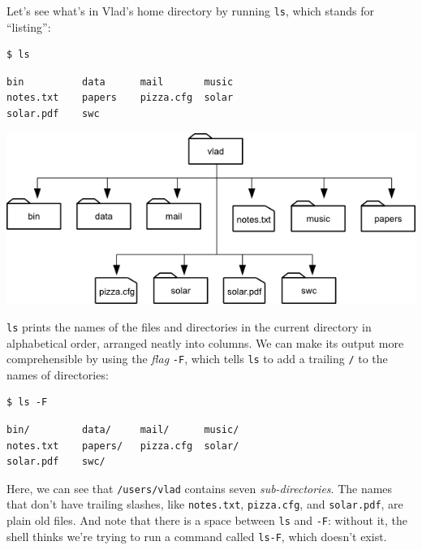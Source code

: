 \documentclass[]{book}
\newcommand{\gdef}[2]{\emph{#2}}
\begin{document}
Let's see what's in Vlad's home directory by running \texttt{ls}, which
stands for ``listing'':

\begin{verbatim}
$ ls
\end{verbatim}

\begin{verbatim}
bin          data      mail       music
notes.txt    papers    pizza.cfg  solar
solar.pdf    swc
\end{verbatim}

\includegraphics{novice/shell/img/vlad-homedir.png}

\texttt{ls} prints the names of the files and directories in the current
directory in alphabetical order, arranged neatly into columns. We can
make its output more comprehensible by using the
\gdef{g:command-line-flag}{flag} \texttt{-F}, which tells
\texttt{ls} to add a trailing \texttt{/} to the names of directories:

\begin{verbatim}
$ ls -F
\end{verbatim}

\begin{verbatim}
bin/         data/     mail/      music/
notes.txt    papers/   pizza.cfg  solar/
solar.pdf    swc/
\end{verbatim}

Here, we can see that \texttt{/users/vlad} contains seven
\gdef{g:sub-directory}{sub-directories}. The names that don't have
trailing slashes, like \texttt{notes.txt}, \texttt{pizza.cfg}, and
\texttt{solar.pdf}, are plain old files. And note that there is a space
between \texttt{ls} and \texttt{-F}: without it, the shell thinks we're
trying to run a command called \texttt{ls-F}, which doesn't exist.
\end{document}

